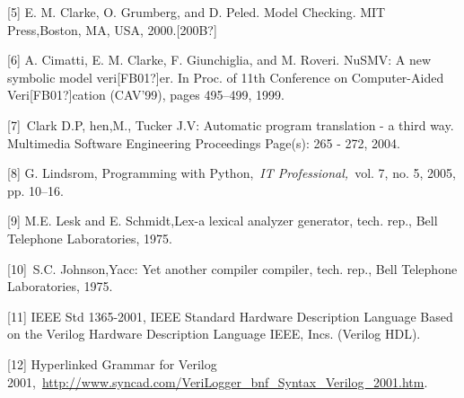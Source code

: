 \documentclass[a4paper]{article}
\begin{document}
{\color[rgb]{0.0,0.0,0.039215688}
\textcolor[rgb]{0.13333334,0.13333334,0.13333334}{[5] E. M. Clarke, O.
Grumberg, and D. Peled. Model Checking. MIT Press,Boston, MA, USA,
2000.[200B?]}}

{\color[rgb]{0.0,0.0,0.039215688}
\textcolor[rgb]{0.13333334,0.13333334,0.13333334}{[6] A. Cimatti, E. M.
Clarke, F. Giunchiglia, and M. Roveri. NuSMV: A new symbolic model
veri[FB01?]er. In Proc. of 11th Conference on Computer-Aided
Veri[FB01?]cation (CAV{\textquoteright}99), pages 495--499, 1999.}}


\bigskip

{\color[rgb]{0.0,0.0,0.039215688}
\textcolor[rgb]{0.13333334,0.13333334,0.13333334}{[7]\ }\textcolor[rgb]{0.13333334,0.13333334,0.13333334}{Clark
D.P, hen,M., Tucker J.V: Automatic program translation - a third way.
Multimedia Software Engineering Proceedings Page(s): 265 - 272, 2004.}}


\bigskip

{\color[rgb]{0.0,0.0,0.039215688}
\textcolor[rgb]{0.13333334,0.13333334,0.13333334}{[8] G. Lindsrom,
{\textquotedbl}Programming with
Python,{\textquotedbl}}\textcolor[rgb]{0.13333334,0.13333334,0.13333334}{~}\textit{\textcolor[rgb]{0.13333334,0.13333334,0.13333334}{IT
Professional,}}\textcolor[rgb]{0.13333334,0.13333334,0.13333334}{~}\textcolor[rgb]{0.13333334,0.13333334,0.13333334}{vol.
7, no. 5, 2005, pp. 10--16.}}


\bigskip

{\color[rgb]{0.0,0.0,0.039215688}
\textcolor[rgb]{0.13333334,0.13333334,0.13333334}{[9] M.E. Lesk and E.
Schmidt,{\textquotedbl}Lex-a lexical analyzer generator,{\textquotedbl}
tech. rep., Bell Telephone Laboratories, 1975.}}


\bigskip

{\color[rgb]{0.0,0.0,0.039215688}
\textcolor[rgb]{0.13333334,0.13333334,0.13333334}{[10]\ }\textcolor[rgb]{0.13333334,0.13333334,0.13333334}{S.C.
Johnson,{\textquotedbl}Yacc: Yet another compiler
compiler,{\textquotedbl} tech. rep., Bell Telephone Laboratories,
1975.}}


\bigskip

{\color[rgb]{0.0,0.0,0.039215688}
\textcolor[rgb]{0.13333334,0.13333334,0.13333334}{[11]
{\textquotedbl}IEEE Std 1365-2001, IEEE Standard Hardware Description
Language Based on the Verilog Hardware Description
Language{\textquotedbl} IEEE, Incs. (Verilog HDL).}}


\bigskip

{\color[rgb]{0.0,0.0,0.039215688}
\textcolor[rgb]{0.13333334,0.13333334,0.13333334}{[12] Hyperlinked
Grammar for Verilog
2001,\ }\url{http://www.syncad.com/VeriLogger_bnf_Syntax_Verilog_2001.htm}.}
\end{document}

